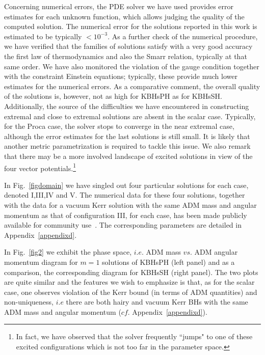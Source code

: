 Concerning numerical errors, the PDE solver we have used provides error estimates for each unknown function, which allows judging the quality of the computed solution. The numerical error for the solutions reported in
this work is estimated to be typically $<10^{-3}$. As a further check of the numerical procedure, we have verified that the families of solutions  satisfy with a very good accuracy the first law of thermodynamics and also the Smarr relation, typically at that same order. We have also monitored the violation of the gauge condition together with the constraint Einstein equations; typically, these provide much lower estimates for the numerical errors. As a comparative comment, the overall quality of the solutions is, however,  not as high for KBHsPH as for KBHsSH.
Additionally, the source of the difficulties we have encountered in constructing extremal and close to extremal solutions are absent in the scalar case. Typically, for the Proca case, the solver stops to converge in the near extremal case,
 although the error estimates for the last solutions is still small. It is likely that another metric parametrization is required to tackle this issue. We also remark that  there may be a more involved landscape of excited solutions in view of the four vector potentials.\footnote{ 
In fact, we have observed that the solver frequently ``jumps"  to one of these excited configurations 
which is not too far in the parameter space.}

In Fig.~\ref{figdomain} we have singled out four particular solutions for each case, denoted I,III,IV and V. The numerical data for these four solutions, together with the data for a vacuum Kerr solution with the same ADM mass and angular momentum as that of configuration III, for each case, has been made publicly available for community use~\cite{datakbhph,datakbhsh}. The corresponding parameters are detailed in Appendix~\ref{appendixd}.

In Fig.~\ref{fig2} we exhibit the phase space, $i.e.$ ADM mass $vs.$ ADM angular momentum diagram for $m=1$ solutions of KBHsPH (left panel) and as a comparison, the corresponding diagram for KBHsSH (right panel). The two plots are quite similar and the features we wish to emphasize is that, as for the scalar case, one observes violation of the Kerr bound (in terms of ADM quantities) and non-uniqueness, $i.e$ there are both hairy and vacuum Kerr BHs with the same ADM mass and angular momentum ($cf.$ Appendix~\ref{appendixd}). 


